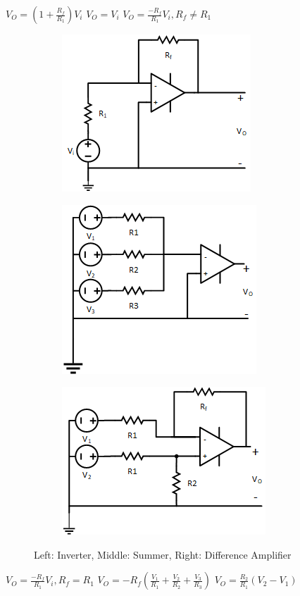 \documentclass[10pt,letterpaper,final,twoside,notitlepage]{article}
\begin{document}
	$V_{O}=\left(1+\frac{R_f}{R_1}\right)V_i$
	\hspace{35mm} $V_{O}=V_{i}$
	\hspace{35mm} $V_{O}=\frac{-R_f}{R_1}V_i, R_f \neq R_1$
	
	\begin{figure}[ht]
		\begin{subfigure}
			\centering
			\includegraphics[scale=.7]{Inverter.png}
			\label{fig:Inverter}
		\end{subfigure}
		\hspace{15mm}
		\begin{subfigure}
			\centering
			\includegraphics[scale=.7]{Summer.png}
			\label{fig:Summer}
		\end{subfigure}
		\hspace{20mm}
		\begin{subfigure}
			\centering
			\includegraphics[scale=.7]{Subtractor.png}
			\label{fig:Subtractor}
		\end{subfigure}
		\caption{Left: Inverter, Middle: Summer, Right: Difference Amplifier}
	\end{figure}
	$V_{O}=\frac{-R_f}{R_1}V_i, R_f=R_1$
	\hspace{25mm} $V_{O} = -R_f\left(\frac{V_1}{R_1}+\frac{V_2}{R_2}+\frac{V_3}{R_3}\right)$
	\hspace{35mm} $V_{O}=\frac{R_2}{R_1}\left(V_2-V_1\right)$
	
\end{document}
